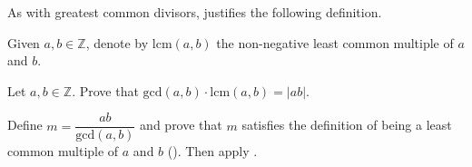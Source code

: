As with greatest common divisors,  justifies the following definition.

\begin{definition}
\label{defLCMFunction}
Given $a,b \in \mathbb{Z}$, denote by $\mathrm{lcm}(a,b)$  the non-negative least common multiple of $a$ and $b$.
\end{definition}

\begin{exercise}
\label{exProductOfIntegersIsProductOfGCDAndLCM}
Let $a,b \in \mathbb{Z}$. Prove that $\mathrm{gcd}(a,b) \cdot \mathrm{lcm}(a,b) = |ab|$.
\begin{backhint}
Define $m = \dfrac{ab}{\mathrm{gcd}(a,b)}$ and prove that $m$ satisfies the definition of being a least common multiple of $a$ and $b$ (). Then apply .
\end{backhint}
\end{exercise}
